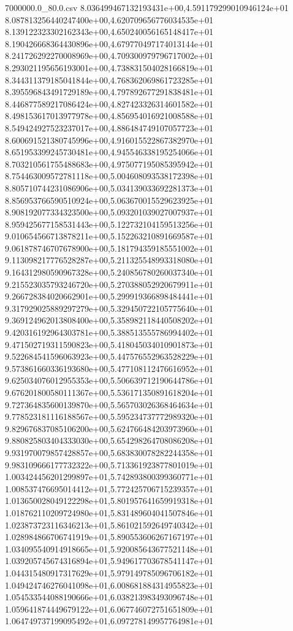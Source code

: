 \begin{filecontents*}{7000000.0_80.0.csv}
8.036499467132193431e+00,4.591179299010946124e+01
8.087813256440247400e+00,4.620709656776034535e+01
8.139122323302162343e+00,4.650240056165148417e+01
8.190426668364430896e+00,4.679770497174013144e+01
8.241726292270008969e+00,4.709300979796717002e+01
8.293021195656193001e+00,4.738831504028166819e+01
8.344311379185041844e+00,4.768362069861723285e+01
8.395596843491729189e+00,4.797892677291838481e+01
8.446877589217086424e+00,4.827423326314601582e+01
8.498153617013977978e+00,4.856954016921008588e+01
8.549424927523237017e+00,4.886484749107057723e+01
8.600691521380745996e+00,4.916015522867382970e+01
8.651953399245730481e+00,4.945546338195254066e+01
8.703210561755488683e+00,4.975077195085395942e+01
8.754463009572781118e+00,5.004608093538172398e+01
8.805710744231086906e+00,5.034139033692281373e+01
8.856953766590510924e+00,5.063670015529623925e+01
8.908192077334323500e+00,5.093201039027007937e+01
8.959425677158531443e+00,5.122732104159513256e+01
9.010654566713878211e+00,5.152263210891669587e+01
9.061878746707678900e+00,5.181794359185551002e+01
9.113098217776528287e+00,5.211325548993318080e+01
9.164312980590967328e+00,5.240856780260037340e+01
9.215523035793246720e+00,5.270388052920679911e+01
9.266728384020662901e+00,5.299919366898484441e+01
9.317929025889297279e+00,5.329450722105775640e+01
9.369124962013808400e+00,5.358982118440508202e+01
9.420316192964303781e+00,5.388513555786994402e+01
9.471502719311590823e+00,5.418045034010901873e+01
9.522684541596063923e+00,5.447576552963528229e+01
9.573861660336193680e+00,5.477108112476616952e+01
9.625034076012955353e+00,5.506639712190644786e+01
9.676201800580111367e+00,5.536171350891618204e+01
9.727364835600139870e+00,5.565703026368464634e+01
9.778523181116188567e+00,5.595234737772989320e+01
9.829676837085106200e+00,5.624766484203973960e+01
9.880825803404333030e+00,5.654298264708086208e+01
9.931970079857428857e+00,5.683830078282244358e+01
9.983109666177732322e+00,5.713361923877801019e+01
1.003424456201299897e+01,5.742893800399360771e+01
1.008537476695014412e+01,5.772425706715239357e+01
1.013650028049122298e+01,5.801957641659919318e+01
1.018762110209724980e+01,5.831489604041507846e+01
1.023873723116346213e+01,5.861021592649740342e+01
1.028984866706741919e+01,5.890553606267167197e+01
1.034095540914918665e+01,5.920085643677521148e+01
1.039205745674316894e+01,5.949617703678541147e+01
1.044315480917317629e+01,5.979149785096706182e+01
1.049424746276041098e+01,6.008681884314955823e+01
1.054533544088190666e+01,6.038213983493096748e+01
1.059641874449679122e+01,6.067746072751651809e+01
1.064749737199095492e+01,6.097278149957764981e+01

\end{filecontents*}
